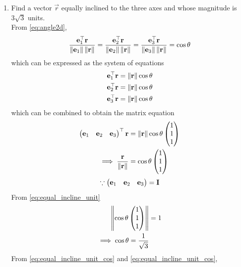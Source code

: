 \documentclass[journal,12pt,twocolumn]{IEEEtran}
\renewcommand\thesection{\arabic{section}}
\begin{document}
\begin{enumerate}[label=\thesection.\arabic*.,ref=\thesection.\theenumi]
\item  Find a vector $\vec{r}$ equally inclined to the three axes and whose magnitude is $3\sqrt{3}$ units.
	\\
	\solution 
    From \eqref{eq:angle2d}, 
  \begin{align}
	  \frac{\mathbf{e}_1^{\top} \mathbf{r}}{\left\lVert\mathbf{e}_1\right\rVert\left\lVert\mathbf{r}\right\rVert} = 
	  \frac{\mathbf{e}_2^{\top} \mathbf{r}}{\left\lVert\mathbf{e}_2\right\rVert\left\lVert\mathbf{r}\right\rVert} = 
	  \frac{\mathbf{e}_3^{\top} \mathbf{r}}{\left\lVert\mathbf{e}_3\right\rVert\left\lVert\mathbf{r}\right\rVert} = \cos \theta
  \end{align}
  which can be expressed as the system of equations
  \begin{align}
	  {\mathbf{e}_1^{\top} \mathbf{r}} = \left\lVert\mathbf{r}\right\rVert\cos \theta
	  \\
	  {\mathbf{e}_2^{\top} \mathbf{r}} = \left\lVert\mathbf{r}\right\rVert\cos \theta
	  \\
	  {\mathbf{e}_3^{\top} \mathbf{r}} = \left\lVert\mathbf{r}\right\rVert\cos \theta
  \end{align}
  which can be combined to obtain the matrix equation
  \begin{align}
	  \begin{pmatrix}\mathbf{e}_1 & \mathbf{e}_2 & \mathbf{e}_3\end{pmatrix}^{\top}\mathbf{r} &= \left\lVert\mathbf{r}\right\rVert\cos \theta \begin{pmatrix}1\\1\\1\end{pmatrix}
	  \\
	  \implies \frac{\mathbf{r}}{\left\lVert\mathbf{r}\right\rVert}&= \cos \theta \begin{pmatrix}1\\1\\1\end{pmatrix}
	  \label{eq:equal_incline_unit}
  \end{align}
  \begin{align}
	  \because 	\begin{pmatrix}\mathbf{e}_1 & \mathbf{e}_2 & \mathbf{e}_3\end{pmatrix} = \mathbf{I}
  \end{align}
  From 
	  \eqref{eq:equal_incline_unit}
  \begin{align}
	  \left\lVert\cos \theta \begin{pmatrix}1\\1\\1\end{pmatrix}\right\rVert &= 1
	  \\
	  \implies\cos \theta  = \frac{1}{\sqrt{3}}
	  \label{eq:equal_incline_unit_cos}
  \end{align}
 From  
	  \eqref{eq:equal_incline_unit_cos} and 
	  \eqref{eq:equal_incline_unit_cos},


\end{enumerate}
\end{document}

